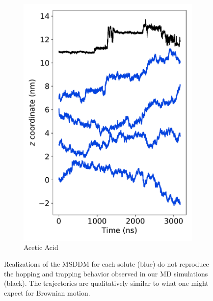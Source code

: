 \documentclass[aps,pre,preprint,groupedaddress,longbibliography]{revtex4-2}
\begin{document}
\begin{figure}
\begin{subfigure}{0.24\textwidth}
  \includegraphics[width=\textwidth]{stacked_msddm_realizations_ACH.pdf}
  \caption{Acetic Acid}\label{fig:stacked_msddm_realizations_ACH}
  \end{subfigure}
  \caption{Realizations of the MSDDM for each solute (blue) do not reproduce 
  the hopping and trapping behavior observed in our MD simulations (black). 
  The trajectories are qualitatively similar to what one might expect for 
  Brownian motion. 
  }\label{fig:msddm_eyetest}
  \end{figure}
  
\end{document}
